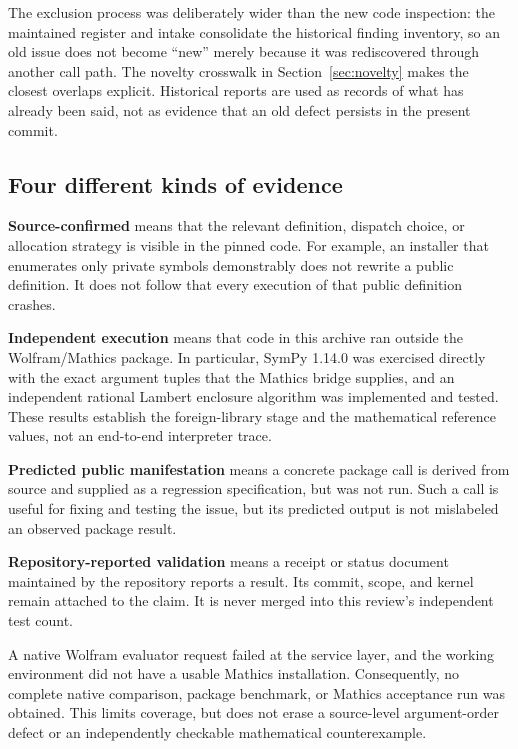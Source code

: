 \documentclass[11pt,letterpaper]{article}
\begin{document}
The exclusion process was deliberately wider than the new code inspection: the maintained register and intake consolidate the historical finding inventory, so an old issue does not become ``new'' merely because it was rediscovered through another call path. The novelty crosswalk in Section~\ref{sec:novelty} makes the closest overlaps explicit. Historical reports are used as records of what has already been said, not as evidence that an old defect persists in the present commit.

\subsection{Four different kinds of evidence}

\textbf{Source-confirmed} means that the relevant definition, dispatch choice, or allocation strategy is visible in the pinned code. For example, an installer that enumerates only private symbols demonstrably does not rewrite a public definition. It does not follow that every execution of that public definition crashes.

\textbf{Independent execution} means that code in this archive ran outside the Wolfram/Mathics package. In particular, SymPy 1.14.0 was exercised directly with the exact argument tuples that the Mathics bridge supplies, and an independent rational Lambert enclosure algorithm was implemented and tested. These results establish the foreign-library stage and the mathematical reference values, not an end-to-end interpreter trace.

\textbf{Predicted public manifestation} means a concrete package call is derived from source and supplied as a regression specification, but was not run. Such a call is useful for fixing and testing the issue, but its predicted output is not mislabeled an observed package result.

\textbf{Repository-reported validation} means a receipt or status document maintained by the repository reports a result. Its commit, scope, and kernel remain attached to the claim. It is never merged into this review's independent test count.

A native Wolfram evaluator request failed at the service layer, and the working environment did not have a usable Mathics installation. Consequently, no complete native comparison, package benchmark, or Mathics acceptance run was obtained. This limits coverage, but does not erase a source-level argument-order defect or an independently checkable mathematical counterexample.
\end{document}
